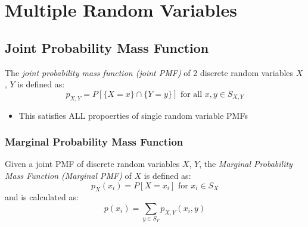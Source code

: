 \section{Multiple Random Variables} \label{sec:Multiple Random Variables}
	\subsection[Joint PMF]{Joint Probability Mass Function} \label{subsec:Joint PMF}
		\begin{definition} \label{def:Joint PMF}
			The \emph{joint probability mass function (joint PMF)} of 2 discrete random variables $X$, $Y$ is defined as:
			\begin{equation} \label{eq:Joint PMF}
				p_{X,Y} = P \left[ \lbrace X=x \rbrace \cap \lbrace Y=y \rbrace \right] \text{ for all } x,y \in S_{X,Y}
			\end{equation}
			\begin{itemize}[noitemsep, nolistsep]
				\item This satisfies ALL propoerties of single random variable PMFs
			\end{itemize}
		\end{definition}
	
		\subsubsection[Marginal PMF]{Marginal Probability Mass Function} \label{subsubsec:Marginal PMF}
			\begin{definition} \label{def:Marginal PMF}
				Given a joint PMF of discrete random variables $X$, $Y$, the \emph{Marginal Probability Mass Function (Marginal PMF)} of $X$ is defined as:
				\begin{equation} \label{eq:Marginal PMF}
					p_{X} \left( x_{i} \right) = P \left[ X = x_{i} \right] \text{ for } x_{i} \in S_{X}
				\end{equation}
				and is calculated as:
				\begin{equation} \label{eq:Calculate Marginal PMF}
					p \left( x_{i} \right) = \sum_{y \in S_{Y}} p_{X,Y} \left( x_{i}, y \right)
				\end{equation}
			\end{definition}
		
